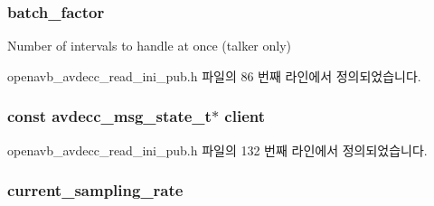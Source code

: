 \subsubsection[{\texorpdfstring{batch\+\_\+factor}{batch_factor}}]{ batch\+\_\+factor}\hypertarget{structopenavb__tl__data__cfg_a9db3c945c8e429a9ca8e13db38447d3c}{}\label{structopenavb__tl__data__cfg_a9db3c945c8e429a9ca8e13db38447d3c}


Number of intervals to handle at once (talker only) 



openavb\+\_\+avdecc\+\_\+read\+\_\+ini\+\_\+pub.\+h 파일의 86 번째 라인에서 정의되었습니다.

\subsubsection[{\texorpdfstring{client}{client}}]{\setlength{\rightskip}{0pt plus 5cm}const {\bf avdecc\+\_\+msg\+\_\+state\+\_\+t}$\ast$ client}\hypertarget{structopenavb__tl__data__cfg_ab98c74d1747db368639fb4a95a8546c5}{}\label{structopenavb__tl__data__cfg_ab98c74d1747db368639fb4a95a8546c5}


openavb\+\_\+avdecc\+\_\+read\+\_\+ini\+\_\+pub.\+h 파일의 132 번째 라인에서 정의되었습니다.

\subsubsection[{\texorpdfstring{current\+\_\+sampling\+\_\+rate}{current_sampling_rate}}]{ current\+\_\+sampling\+\_\+rate}\hypertarget{structopenavb__tl__data__cfg_aa2a20a90661f499e91e4a4eb8aea4666}{}\label{structopenavb__tl__data__cfg_aa2a20a90661f499e91e4a4eb8aea4666}


